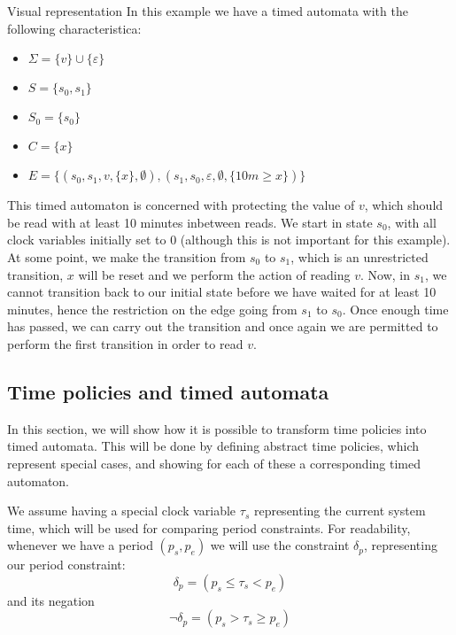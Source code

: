 \begin{example}{Visual representation}\label{time:ex:visualrepresentation}
In this example we have a timed automata with the following characteristica:
\begin{itemize}
  \item $\Sigma = \{ v \} \cup \{ \varepsilon \}$
  \item $S = \{ s_0, s_1 \}$
  \item $S_0 = \{ s_0 \}$
  \item $C = \{ x \}$
  \item $E = \{ (s_0, s_1, v, \{ x \}, \emptyset), (s_1, s_0, \varepsilon, \emptyset, \{ 10m \geq x \})\}$
\end{itemize}
This timed automaton is concerned with protecting the value of $v$, which should be read with at least 10 minutes inbetween reads.
We start in state $s_0$, with all clock variables initially set to $0$ (although this is not important for this example).
At some point, we make the transition from $s_0$ to $s_1$, which is an unrestricted transition, $x$ will be reset and we perform the action of reading $v$.
Now, in $s_1$, we cannot transition back to our initial state before we have waited for at least 10 minutes, hence the restriction on the edge going from $s_1$ to $s_0$.
Once enough time has passed, we can carry out the transition and once again we are permitted to perform the first transition in order to read $v$.

  \begin{figure}[H]
    \centering
    
  \end{figure}
\end{example}

\subsection{Time policies and timed automata}\label{automata:timepolicies}
In this section, we will show how it is possible to transform \thelang{} time policies into timed automata.
This will be done by defining abstract time policies, which represent special cases, and showing for each of these a corresponding timed automaton.

We assume having a special clock variable $\tau_s$ representing the current system time, which will be used for comparing period constraints.
For readability, whenever we have a period $(p_s, p_e)$ we will use the constraint $\delta_p$, representing our period constraint:
\[ \delta_p = (p_s \leq \tau_s < p_e) \]
and its negation
\[ \lnot\delta_p = (p_s > \tau_s \geq p_e) \]

